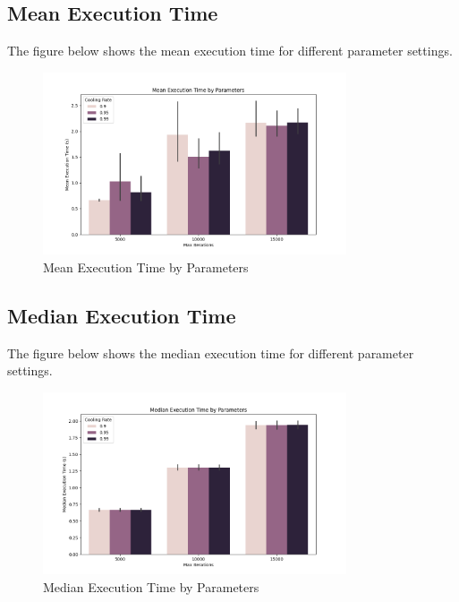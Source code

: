 \documentclass[
]{article}
\begin{document}
    \subsection{Mean Execution Time}\label{subsec:mean-execution-time}

    The figure below shows the mean execution time for different parameter settings.

    \begin{figure}[H]
        \centering
        \includegraphics[width=0.8\textwidth]{simulated_annealing/mean_execution_time.png}
        \caption{Mean Execution Time by Parameters}
        \label{fig:mean_execution_time}
    \end{figure}

    \subsection{Median Execution Time}\label{subsec:median-execution-time}

    The figure below shows the median execution time for different parameter settings.

    \begin{figure}[H]
        \centering
        \includegraphics[width=0.8\textwidth]{simulated_annealing/median_execution_time.png}
        \caption{Median Execution Time by Parameters}
        \label{fig:median_execution_time}
    \end{figure}
\end{document}
